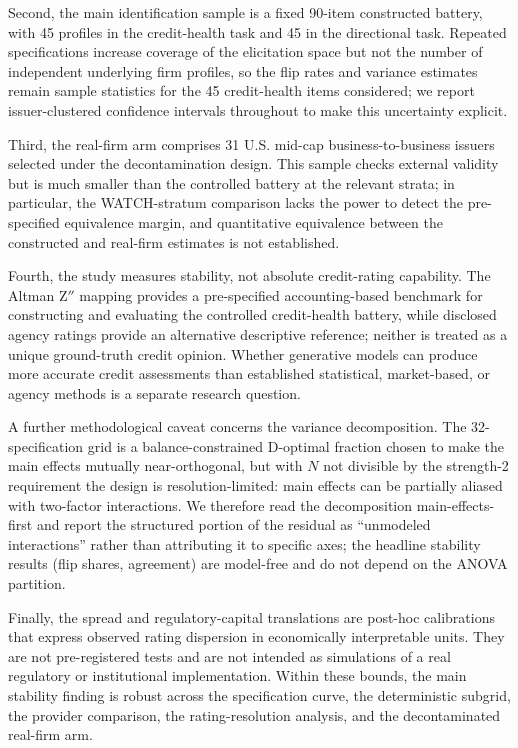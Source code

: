 \documentclass[a4paper,fleqn]{cas-sc}
\begin{document}
Second, the main identification sample is a fixed 90-item constructed battery, with 45 profiles in the
credit-health task and 45 in the directional task. Repeated specifications increase coverage of the
elicitation space but not the number of independent underlying firm profiles, so the flip rates and
variance estimates remain sample statistics for the 45 credit-health items considered; we report
issuer-clustered confidence intervals throughout to make this uncertainty explicit.

Third, the real-firm arm comprises 31 U.S. mid-cap business-to-business issuers selected under the
decontamination design. This sample checks external validity but is much smaller than the controlled
battery at the relevant strata; in particular, the WATCH-stratum comparison lacks the power to detect the
pre-specified equivalence margin, and quantitative equivalence between the constructed and real-firm
estimates is not established.

Fourth, the study measures stability, not absolute credit-rating capability. The Altman Z$''$ mapping
provides a pre-specified accounting-based benchmark for constructing and evaluating the controlled
credit-health battery, while disclosed agency ratings provide an alternative descriptive reference;
neither is treated as a unique ground-truth credit opinion. Whether generative models can produce more
accurate credit assessments than established statistical, market-based, or agency methods is a separate
research question.

A further methodological caveat concerns the variance decomposition. The 32-specification grid is a
balance-constrained D-optimal fraction chosen to make the main effects mutually near-orthogonal, but with
$N$ not divisible by the strength-2 requirement the design is resolution-limited: main effects can be
partially aliased with two-factor interactions. We therefore read the decomposition main-effects-first
and report the structured portion of the residual as ``unmodeled interactions'' rather than attributing
it to specific axes; the headline stability results (flip shares, agreement) are model-free and do not
depend on the ANOVA partition.

Finally, the spread and regulatory-capital translations are post-hoc calibrations that express observed
rating dispersion in economically interpretable units. They are not pre-registered tests and are not
intended as simulations of a real regulatory or institutional implementation. Within these bounds, the
main stability finding is robust across the specification curve, the deterministic subgrid, the provider
comparison, the rating-resolution analysis, and the decontaminated real-firm arm.
\end{document}
